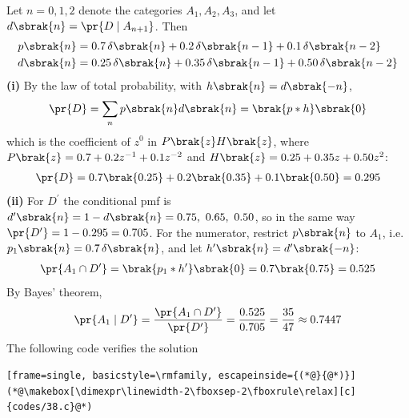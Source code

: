\begin{enumerate}[label=\thesubsection.\arabic*, ref=\thesubsection.\theenumi]
\solution
Let $n = 0, 1, 2$ denote the categories $A_1, A_2, A_3$, and let $d\sbrak{n} = \pr{D\mid A_{n+1}}$. Then
\begin{align}
	p\sbrak{n} &= 0.7\,\delta\sbrak{n} + 0.2\,\delta\sbrak{n-1} + 0.1\,\delta\sbrak{n-2}
	\\
	d\sbrak{n} &= 0.25\,\delta\sbrak{n} + 0.35\,\delta\sbrak{n-1} + 0.50\,\delta\sbrak{n-2}
\end{align}
\textbf{(i)} By the law of total probability, with $h\sbrak{n} = d\sbrak{-n}$,
\begin{align}
	\pr{D} = \sum_{n} p\sbrak{n}d\sbrak{n} = \brak{p*h}\sbrak{0}
\end{align}
which is the coefficient of $z^0$ in $P\brak{z}H\brak{z}$, where $P\brak{z} = 0.7 + 0.2z^{-1} + 0.1z^{-2}$ and $H\brak{z} = 0.25 + 0.35z + 0.50z^{2}$:
\begin{align}
	\pr{D} = 0.7\brak{0.25} + 0.2\brak{0.35} + 0.1\brak{0.50} = 0.295
\end{align}
\textbf{(ii)} For $D^{\prime}$ the conditional pmf is $d^{\prime}\sbrak{n} = 1 - d\sbrak{n} = 0.75,\ 0.65,\ 0.50$, so in the same way $\pr{D^{\prime}} = 1 - 0.295 = 0.705$. For the numerator, restrict $p\sbrak{n}$ to $A_1$, i.e.\ $p_1\sbrak{n} = 0.7\,\delta\sbrak{n}$, and let $h^{\prime}\sbrak{n} = d^{\prime}\sbrak{-n}$:
\begin{align}
	\pr{A_1\cap D^{\prime}} = \brak{p_1 * h^{\prime}}\sbrak{0} = 0.7\brak{0.75} = 0.525
\end{align}
By Bayes' theorem,
\begin{align}
	\pr{A_1\mid D^{\prime}} = \frac{\pr{A_1\cap D^{\prime}}}{\pr{D^{\prime}}} = \frac{0.525}{0.705} = \frac{35}{47} \approx 0.7447
\end{align}
The following code verifies the solution
\begin{lstlisting}[frame=single, basicstyle=\rmfamily, escapeinside={(*@}{@*)}]
(*@\makebox[\dimexpr\linewidth-2\fboxsep-2\fboxrule\relax][c]{codes/38.c}@*)
\end{lstlisting}

\end{enumerate}
